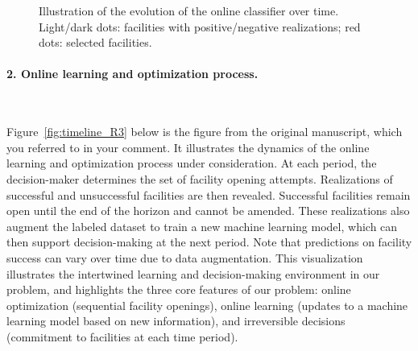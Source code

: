 \documentclass[11pt]{article}
\begin{document}
\begin{figure}[h!]
{    
    }
	\caption{Illustration of the evolution of the online classifier over time. Light/dark dots: facilities with positive/negative realizations; red dots: selected facilities.}
    \label{fig:error_R3}
\end{figure}

\paragraph{2. Online learning and optimization process.}\

Figure~\ref{fig:timeline_R3} below is the figure from the original manuscript, which you referred to in your comment. It illustrates the dynamics of the online learning and optimization process under consideration. At each period, the decision-maker determines the set of facility opening attempts. Realizations of successful and unsuccessful facilities are then revealed. Successful facilities remain open until the end of the horizon and cannot be amended. These realizations also augment the labeled dataset to train a new machine learning model, which can then support decision-making at the next period. Note that predictions on facility success can vary over time due to data augmentation. This visualization illustrates the intertwined learning and decision-making environment in our problem, and highlights the three core features of our problem: online optimization (sequential facility openings), online learning (updates to a machine learning model based on new information), and irreversible decisions (commitment to facilities at each time period).
\end{document}
